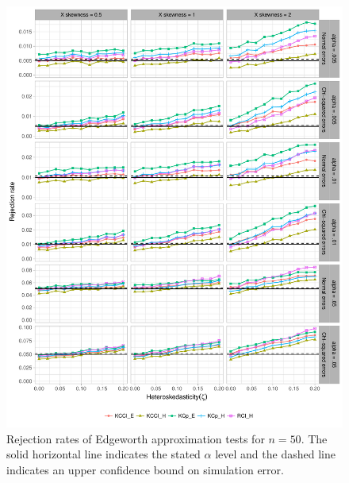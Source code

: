 \documentclass[12pt]{article}\usepackage[]{graphicx}\usepackage[]{color}
\newenvironment{knitrout}{}{} %
\begin{document}
\begin{knitrout}
\color{fgcolor}\begin{figure}[p]

{\centering \includegraphics[width=\linewidth]{HC_fig/Edgeworth_size-1} 

}

\caption[Rejection rates of Edgeworth approximation tests for $n = 50$]{Rejection rates of Edgeworth approximation tests for $n = 50$. The solid horizontal line indicates the stated $\alpha$ level and the dashed line indicates an upper confidence bound on simulation error.}\label{fig:Edgeworth_size}
\end{figure}


\end{knitrout}
\end{document}
